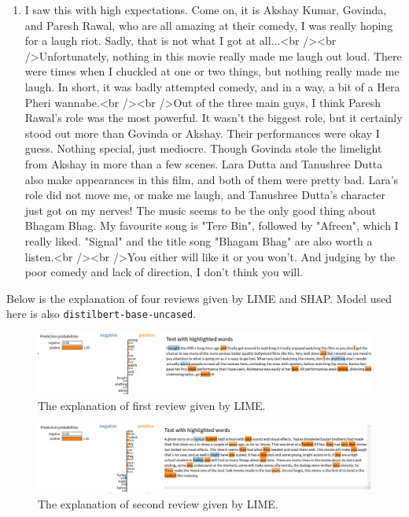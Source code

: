 \documentclass{article}[12pt]
\begin{document}
\begin{enumerate}
	\item I saw this with high expectations. Come on, it is Akshay Kumar, Govinda, and Paresh Rawal, who are all amazing at their comedy, I was really hoping for a laugh riot. Sadly, that is not what I got at all...<br /><br />Unfortunately, nothing in this movie really made me laugh out loud. There were times when I chuckled at one or two things, but nothing really made me laugh. In short, it was badly attempted comedy, and in a way, a bit of a Hera Pheri wannabe.<br /><br />Out of the three main guys, I think Paresh Rawal's role was the most powerful. It wasn't the biggest role, but it certainly stood out more than Govinda or Akshay. Their performances were okay I guess. Nothing special, just mediocre. Though Govinda stole the limelight from Akshay in more than a few scenes. Lara Dutta and Tanushree Dutta also make appearances in this film, and both of them were pretty bad. Lara's role did not move me, or make me laugh, and Tanushree Dutta's character just got on my nerves! The music seems to be the only good thing about Bhagam Bhag. My favourite song is "Tere Bin", followed by "Afreen", which I really liked. "Signal" and the title song "Bhagam Bhag" are also worth a listen.<br /><br />You either will like it or you won't. And judging by the poor comedy and lack of direction, I don't think you will.
	
\end{enumerate}

Below is the explanation of four reviews given by LIME and SHAP. Model used here is also \texttt{distilbert-base-uncased}. 

\begin{figure}[htbp]
	\centering
	\includegraphics[width=\linewidth]{figure/lime-imdb-1}
	\caption{The explanation of first review given by LIME.}
	\label{fig:lime-imdb-1}
\end{figure}

\begin{figure}[htbp]
	\centering
	\includegraphics[width=\linewidth]{figure/lime-imdb-2}
	\caption{The explanation of second review given by LIME.}
	\label{fig:lime-imdb-2}
\end{figure}
\end{document}
